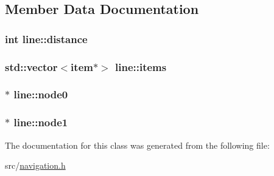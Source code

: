\subsection{\-Member \-Data \-Documentation}
\hypertarget{classline_a255bc674eb5526f5cad9a9e65368b095}{
\subsubsection[{distance}]{\setlength{\rightskip}{0pt plus 5cm}int {\bf line\-::distance}}}\label{classline_a255bc674eb5526f5cad9a9e65368b095}
\hypertarget{classline_afc47d5dc7b895126e90664594977ff8b}{
\subsubsection[{items}]{\setlength{\rightskip}{0pt plus 5cm}std\-::vector$<${\bf item}$\ast$$>$ {\bf line\-::items}}}\label{classline_afc47d5dc7b895126e90664594977ff8b}
\hypertarget{classline_a12a1b9a7e00560e559aec4a4753a50ef}{
\subsubsection[{node0}]{$\ast$ {\bf line\-::node0}}}\label{classline_a12a1b9a7e00560e559aec4a4753a50ef}
\hypertarget{classline_a7d34083bf3194855290b5b5253d95a4a}{
\subsubsection[{node1}]{$\ast$ {\bf line\-::node1}}}\label{classline_a7d34083bf3194855290b5b5253d95a4a}


\-The documentation for this class was generated from the following file\-:\begin{DoxyCompactItemize}
\item 
src/\hyperlink{navigation_8h}{navigation.\-h}\end{DoxyCompactItemize}
